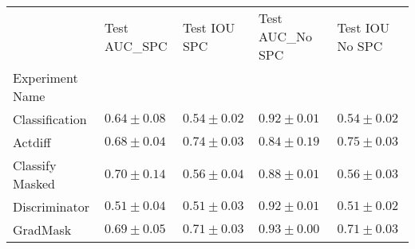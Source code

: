 \begin{tabular}{lllll}
\toprule
{} & Test AUC_SPC & Test IOU SPC & Test AUC_No SPC & Test IOU No SPC \\
Experiment Name      &                     &                     &                     &                     \\
\midrule
Classification       &       $0.64\pm0.08$ &       $0.54\pm0.02$ &       $0.92\pm0.01$ &       $0.54\pm0.02$ \\
Actdiff              &       $\mathbf{0.68\pm0.04}$ &       $\mathbf{0.74\pm0.03}$ &       $\mathbf{0.84\pm0.19}$ &       $\mathbf{0.75\pm0.03}$ \\
Classify Masked      &       $0.70\pm0.14$ &       $0.56\pm0.04$ &       $0.88\pm0.01$ &       $0.56\pm0.03$ \\
Discriminator        &       $0.51\pm0.04$ &       $0.51\pm0.03$ &       $0.92\pm0.01$ &       $0.51\pm0.02$ \\
GradMask             &       $\mathbf{0.69\pm0.05}$ &       $\mathbf{0.71\pm0.03}$ &       $\mathbf{0.93\pm0.00}$ &       $\mathbf{0.71\pm0.03}$ \\
\bottomrule
\end{tabular}
